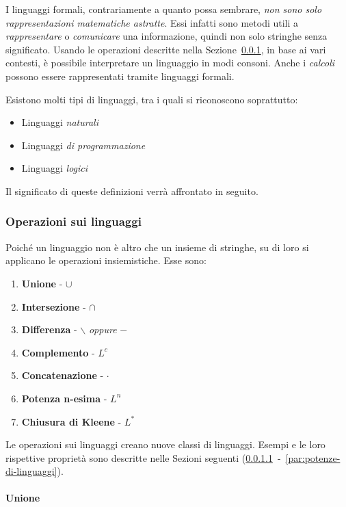 \documentclass[italian, 10pt]{article}
\begin{document}
I linguaggi formali, contrariamente a quanto possa sembrare, \textit{non sono solo rappresentazioni matematiche astratte}.
Essi infatti sono metodi utili a \textit{rappresentare} o \textit{comunicare} una informazione, quindi non solo stringhe senza significato.
Usando le operazioni descritte nella Sezione~\ref{sec:operazioni-linguaggi}, in base ai vari contesti, è possibile interpretare un linguaggio in modi consoni.
Anche i \textit{calcoli} possono essere rappresentati tramite linguaggi formali.

Esistono molti tipi di linguaggi, tra i quali si riconoscono soprattutto:

\begin{itemize}
  \item Linguaggi \textit{naturali}
  \item Linguaggi \textit{di programmazione}
  \item Linguaggi \textit{logici}
\end{itemize}

Il significato di queste definizioni verrà affrontato in seguito.

\subsubsection{Operazioni sui linguaggi}
\label{sec:operazioni-linguaggi}

Poiché un linguaggio non è altro che un insieme di stringhe, su di loro si applicano le operazioni insiemistiche.
Esse sono:

\begin{enumerate}
  \item \textbf{Unione} - \(\cup\)
  \item \textbf{Intersezione} - \(\cap\)
  \item \textbf{Differenza} - \(\backslash\) \textit{oppure} \(-\)
  \item \textbf{Complemento} - \(L^c\)
  \item \textbf{Concatenazione} - \(\cdot\)
  \item \textbf{Potenza n-esima} - \(L^n\)
  \item \textbf{Chiusura di Kleene} - \(L^\ast\)
\end{enumerate}

Le operazioni sui linguaggi creano nuove classi di linguaggi.
Esempi e le loro rispettive proprietà sono descritte nelle Sezioni seguenti (\ref{par:unione-di-linguaggi}~-~\ref{par:potenze-di-linguaggi}).

\paragraph{Unione}
\label{par:unione-di-linguaggi}
\end{document}
